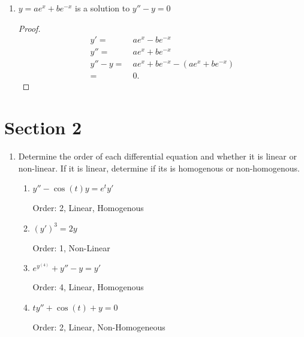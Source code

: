 \documentclass[12pt]{article}
\begin{document}
\begin{enumerate}
\begin{enumerate}
    \item \(y = ae^x + be^{-x}\) is a solution to \(y'' - y = 0\)
    \begin{proof}
      \begin{align*}
        y' = & \ ae^x - be^{-x} \\
        y'' = & \ ae^x + be^{-x} \\
        y'' - y = & \ ae^x + be^{-x} - (ae^x + be^{-x}) \\
        = & \ 0.
      \end{align*}
    \end{proof}

  \end{enumerate}
  
\end{enumerate}


\pagebreak
\section*{Section 2}

\begin{enumerate}
  \item Determine the order of each differential equation and whether it is linear or non-linear. If it is linear, determine if its is homogenous or non-homogenous.
  \begin{enumerate}
    \item \(y'' - \cos(t)y = e^{t}y'\)
    
    Order: 2, Linear, Homogenous

    \item \({(y')}^3 = 2y\)
    
    Order: 1, Non-Linear

    \item \(e^{y^{(4)}} + y'' - y = y'\)
    
    Order: 4, Linear, Homogenous

    \item \(ty'' + \cos(t) + y = 0\)
    
    Order: 2, Linear, Non-Homogeneous

  \end{enumerate} 
\end{enumerate}
\end{document}
